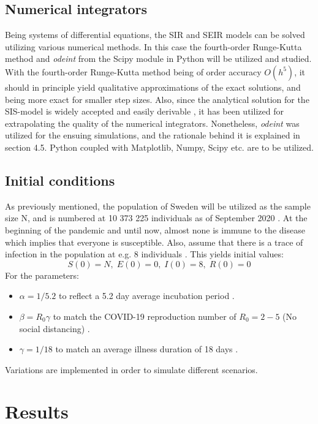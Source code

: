 \documentclass[12pt]{article}
\begin{document}
\subsection{Numerical integrators}
Being systems of differential equations, the SIR and SEIR models can be solved utilizing various numerical methods. In this case the fourth-order Runge-Kutta method and \textit{odeint} from the Scipy module in Python will be utilized and studied. 
With the fourth-order Runge-Kutta method being of order accuracy $O(h^5)$, it should in principle yield qualitative approximations of the exact solutions, and being more exact for smaller step sizes. Also, since the analytical solution for the SIS-model is widely accepted and easily derivable \cite{söder}, it has been utilized for extrapolating the quality of the numerical integrators. Nonetheless, \textit{odeint} was utilized for the ensuing simulations, and the rationale behind it is explained in section 4.5. Python coupled with Matplotlib, Numpy, Scipy etc. are to be utilized.
\subsection{Initial conditions}
As previously mentioned, the population of Sweden will be utilized as the sample size N, and is numbered at 10 373 225 individuals as of September 2020 \cite{Scb}. At the beginning of the pandemic and until now, almost none is immune to the disease which implies that everyone is susceptible. Also, assume that there is a trace of infection in the population at e.g. 8 individuals \cite{smith_moore}. This yields initial values: 
\begin{equation}
S(0) = N, \; E(0) = 0, \; I(0) = 8, \; R(0) = 0
\end{equation}
For the parameters:
\begin{itemize}
  \item $\alpha = 1/5.2$ to reflect a 5.2 day average incubation period \cite{atkeson}.
  \item $\beta = R_0 \gamma$ to match the COVID-19 reproduction number of $R_0 = 2-5$ \newline (No social distancing) \cite{sanche}. 
  \item $\gamma = 1/18$ to match an average illness duration of 18 days \cite{atkeson}.
\end{itemize}
Variations are implemented in order to simulate different scenarios.
\newpage 
\section{Results}
\end{document}
